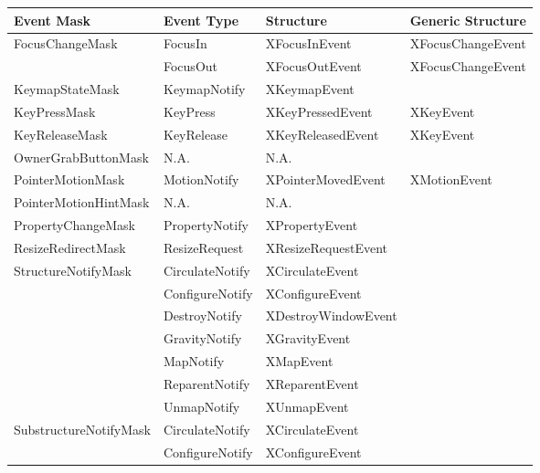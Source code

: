 \documentclass{report}
\begin{document}
\begin{itemize}
            \begin{center}
                \begin{tabularx}{\textwidth}{@{}XlXl@{}}
                    \toprule
                    \textbf{Event Mask}& \textbf{Event Type}& \textbf{Structure} &\textbf{Generic Structure} \\
                    \midrule
                    FocusChangeMask &FocusIn &XFocusInEvent &XFocusChangeEvent\\[2ex]
                                    &FocusOut &XFocusOutEvent &XFocusChangeEvent  \\
                    KeymapStateMask &KeymapNotify &XKeymapEvent & \\[2ex]
                    KeyPressMask &KeyPress &XKeyPressedEvent &XKeyEvent\\[2ex]
                    KeyReleaseMask &KeyRelease &XKeyReleasedEvent &XKeyEvent\\[2ex]
                    OwnerGrabButtonMask & N.A. & N.A. & \\[2ex]
                    PointerMotionMask &MotionNotify &XPointerMovedEvent &XMotionEvent\\[2ex]
                    PointerMotionHintMask &N.A. &  N.A. & \\[2ex]
                    PropertyChangeMask &PropertyNotify &XPropertyEvent & \\[2ex]
                    ResizeRedirectMask &ResizeRequest & XResizeRequestEvent &\\[2ex]
                    StructureNotifyMask &CirculateNotify &XCirculateEvent &\\[2ex]
                                        &ConfigureNotify &XConfigureEvent &  \\[2ex]
                                        &DestroyNotify &XDestroyWindowEvent &  \\[2ex]
                                        &GravityNotify &XGravityEvent &  \\[2ex]
                                        &MapNotify &XMapEvent &  \\[2ex]
                                        &ReparentNotify & XReparentEvent & \\[2ex]
                                        &UnmapNotify & XUnmapEvent& \\[2ex]
                    SubstructureNotifyMask &CirculateNotify &XCirculateEvent&\\[2ex]
                                        &ConfigureNotify &XConfigureEvent &\\[2ex]

\end{tabularx}
\end{center}
\end{itemize}
\end{document}
